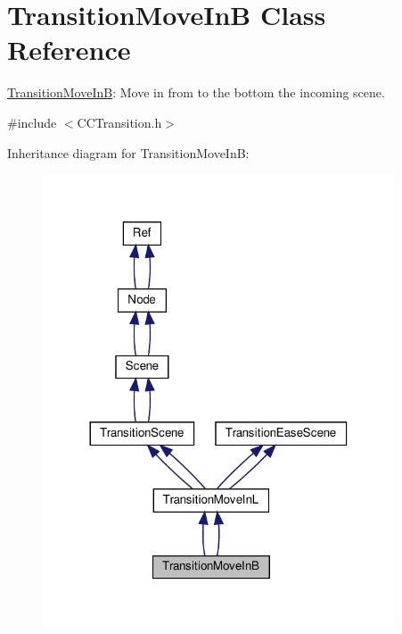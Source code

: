 \hypertarget{classTransitionMoveInB}{}\section{Transition\+Move\+InB Class Reference}
\label{classTransitionMoveInB}


\hyperlink{classTransitionMoveInB}{Transition\+Move\+InB}\+: Move in from to the bottom the incoming scene.  




{\ttfamily \#include $<$C\+C\+Transition.\+h$>$}



Inheritance diagram for Transition\+Move\+InB\+:
\nopagebreak
\begin{figure}[H]
\begin{center}
\leavevmode
\includegraphics[width=296pt]{classTransitionMoveInB__inherit__graph}
\end{center}
\end{figure}



